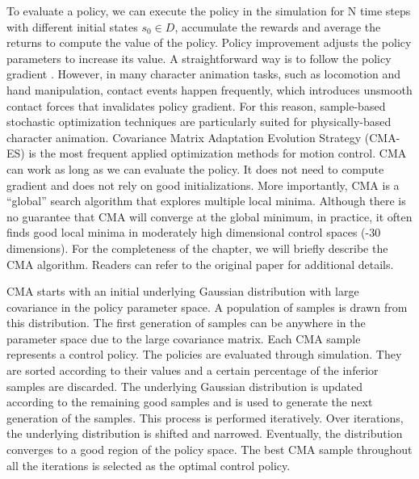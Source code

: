To evaluate a policy, we can execute the policy in the simulation for N time steps with different initial states $s_0\in D$, accumulate the rewards and average the returns to compute the value of the policy. Policy improvement adjusts the policy parameters to increase its value. A straightforward way is to follow the policy gradient \cite{Ng:2000:PPS}. However, in many character animation tasks, such as locomotion and hand manipulation, contact events happen frequently, which introduces unsmooth contact forces that invalidates policy gradient. For this reason, sample-based stochastic optimization techniques are particularly suited for physically-based character animation. Covariance Matrix Adaptation Evolution Strategy (CMA-ES) \cite{hansen2006cma} is the most frequent applied optimization methods for motion control. CMA can work as long as we can evaluate the policy. It does not need to compute gradient and does not rely on good initializations. More importantly, CMA is a ``global'' search algorithm that explores multiple local minima. Although there is no guarantee that CMA will converge at the global minimum, in practice, it often finds good local minima in moderately high dimensional control spaces (-30 dimensions). For the completeness of the chapter, we will briefly describe the CMA algorithm. Readers can refer to the original paper \cite{hansen2006cma} for additional details.

CMA starts with an initial underlying Gaussian distribution with large covariance in the policy parameter space. A population of samples is drawn from this distribution. The first generation of samples can be anywhere in the parameter space due to the large covariance matrix. Each CMA sample represents a control policy. The policies are evaluated through simulation. They are sorted according to their values and a certain percentage of the inferior samples are discarded. The underlying Gaussian distribution is updated according to the remaining good samples and is used to generate the next generation of the samples. This process is performed iteratively. Over iterations, the underlying distribution is shifted and narrowed. Eventually, the distribution converges to a good region of the policy space. The best CMA sample throughout all the iterations is selected as the optimal control policy.

